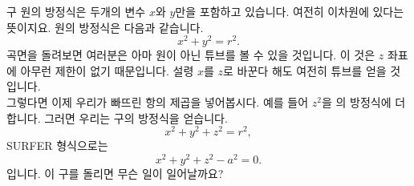 ﻿\begin{surferPage}{구}
원의 방정식은 두개의 변수 $x$와 $y$만을 포함하고 있습니다. 여전히 이차원에 있다는 뜻이지요.
원의 방정식은 다음과 같습니다.
\[x^2+y^2=r^2.\]
곡면을 돌려보면 여러분은 아마 원이 아닌 튜브를 볼 수 있을 것입니다. 이 것은 $z$ 좌표에 아무런 제한이 없기 때문입니다. 설령 $x$를 $z$로 바꾼다 해도 여전히 튜브를 얻을 것입니다.\\
그렇다면 이제 우리가 빠뜨린 항의 제곱을 넣어봅시다. 예를 들어 $z^2$을 의 방정식에 더합니다.
그러면 우리는 구의 방정식을 얻습니다.
\[x^2+y^2+z^2=r^2,\]
SURFER 형식으로는
\[x^2+y^2+z^2-a^2=0.\]
입니다. 이 구를 돌리면 무슨 일이 일어날까요?
\end{surferPage}
